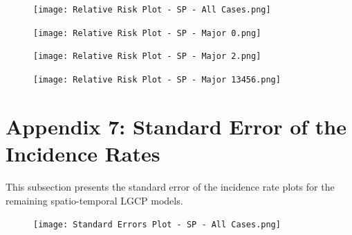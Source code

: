     \begin{figure}[H]
        \begin{center}
            \texttt{[image: Relative Risk Plot - SP - All Cases.png]}
        \end{center}
    \end{figure}

    \begin{figure}[H]
        \begin{center}
            \texttt{[image: Relative Risk Plot - SP - Major 0.png]}
        \end{center}
    \end{figure}

    \begin{figure}[H]
        \begin{center}
            \texttt{[image: Relative Risk Plot - SP - Major 2.png]}
        \end{center}
    \end{figure}

    \begin{figure}[H]
        \begin{center}
            \texttt{[image: Relative Risk Plot - SP - Major 13456.png]}
        \end{center}
    \end{figure}

    \newpage


\section*{Appendix 7: Standard Error of the Incidence Rates}

    This subsection presents the standard error of the incidence rate plots for the remaining spatio-temporal LGCP models.

    \begin{figure}[H]
        \begin{center}
            \texttt{[image: Standard Errors Plot - SP - All Cases.png]}
        \end{center}
    \end{figure}

